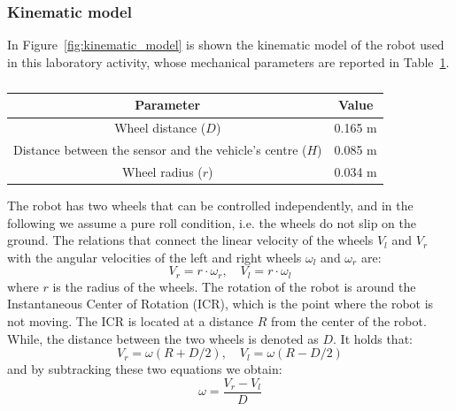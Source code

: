 \subsubsection{Kinematic model}
In Figure~\ref{fig:kinematic_model} is shown the kinematic model of the robot used in this laboratory activity, whose mechanical parameters are reported in Table~\ref{tab: mech_param}.
\begin{table}[H]
    \centering
    \begin{tabular}{cc}
        \toprule
        \textbf{Parameter}  & \textbf{Value} \\
        \midrule
        Wheel distance ($D$) & 0.165 m \\
        Distance between the sensor and the vehicle's centre ($H$) & 0.085 m \\
        Wheel radius ($r$) & 0.034 m \\
        \bottomrule 
    \end{tabular}
    \caption{}
    \label{tab: mech_param}
\end{table}
The robot has two wheels that can be controlled independently, and in the following we assume a pure roll condition, i.e. the wheels do not slip on the ground.
The relations that connect the linear velocity of the wheels $V_l$ and $V_r$ with the angular velocities of the left and right wheels $\omega_l$ and $\omega_r$ are:
\begin{equation}
    V_r = r \cdot \omega_r, \quad V_l = r \cdot \omega_l
\end{equation}
where $r$ is the radius of the wheels.
The rotation of the robot is around the Instantaneous Center of Rotation (ICR), which is the point where the robot is not moving. The ICR is located at a distance $R$ from the center of the robot.
While, the distance between the two wheels is denoted as $D$. It holds that:
\begin{equation}
    V_r = \omega(R+D/2), \quad V_l = \omega(R-D/2)
\end{equation}
and by subtracking these two equations we obtain:
\begin{equation}
    \omega = \frac{V_r - V_l}{D}
\end{equation}


